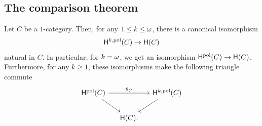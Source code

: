 \subsection{The comparison theorem}
\begin{theorem}\label{thm:polhom}
  Let $C$ be a $1$\nbd-category. Then, for any $1
  \leq k \leq \omega$, there is a canonical isomorphism
  \[
    \mathsf{H}^{k,\mathrm{pol}}(C) \to \mathsf{H}(C)
  \]
  natural in $C$. In particular, for $k=\omega$, we get an isomorphism
  $\mathsf{H}^{\mathrm{pol}}(C) \to \mathsf{H}(C)$. Furthermore, for any $k\geq 1$, these
  isomorphisms make the following triangle commute
  \[
    \begin{tikzcd}[column sep=small]      
         \Hopol(C)\ar[dr]
         \ar[rr,"\homnat_C"]&&\Hop{k}(C)\ar[dl]\\
         &\Ho(C).&
    \end{tikzcd}
  \]
\end{theorem}

